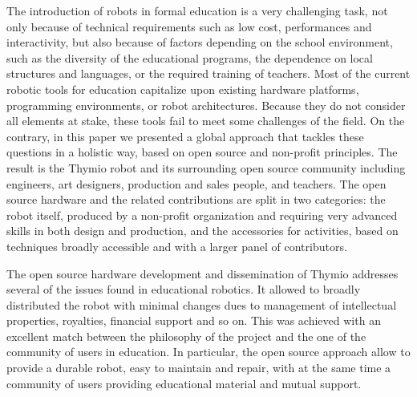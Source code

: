 \documentclass[letterpaper, 10 pt, conference]{ieeeconf}  %
\begin{document}
The introduction of robots in formal education is a very challenging task, not only because of technical requirements such as low cost, performances and interactivity, but also because of factors depending on the school environment, such as the diversity of the educational programs, the dependence on local structures and languages, or the required training of teachers.
Most of the current robotic tools for education capitalize upon existing hardware platforms, programming environments, or robot architectures.
Because they do not consider all elements at stake, these tools fail to meet some challenges of the field.
On the contrary, in this paper we presented a global approach that tackles these questions in a holistic way, based on open source and non-profit principles.
The result is the Thymio robot and its surrounding open source community including engineers, art designers, production and sales people, and teachers.
The open source hardware and the related contributions are split in two categories: the robot itself, produced by a non-profit organization and requiring very advanced skills in both design and production, and the accessories for activities, based on techniques broadly accessible and with a larger panel of contributors.

The open source hardware development and dissemination of Thymio addresses several of the issues found in educational robotics.
It allowed to broadly distributed the robot with minimal changes dues to management of intellectual properties, royalties, financial support and so on.
This was achieved with an excellent match between the philosophy of the project and the one of the community of users in education.
In particular, the open source approach allow to provide a durable robot, easy to maintain and repair, with at the same time a community of users providing educational material and mutual support.
\end{document}
